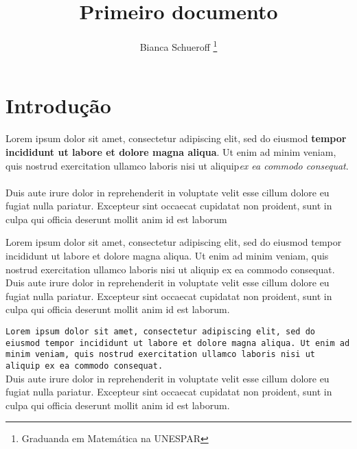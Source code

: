 \documentclass[12pt, a4paper, oneside]{book}
\title{Primeiro documento}
\author{Bianca Schueroff \footnote{Graduanda em Matemática na UNESPAR}}
\begin{document}

\maketitle %


\chapter{Introdução}
\noindent
\textcolor{ocre}{Lorem ipsum dolor sit amet, consectetur adipiscing elit, sed do eiusmod \textbf{tempor incididunt ut labore et dolore magna aliqua}. Ut enim ad minim veniam, quis nostrud exercitation ullamco laboris nisi ut aliquip\textit{ex ea commodo consequat}}.\\

\dotfill\\

\noindent
Duis aute irure dolor in reprehenderit in voluptate velit esse cillum dolore eu fugiat nulla pariatur. Excepteur sint occaecat cupidatat non proident, sunt in culpa qui officia deserunt mollit anim id est laborum


\begin{center}
\Large{\textsf{Lorem ipsum dolor sit amet, consectetur adipiscing elit, sed do eiusmod tempor incididunt ut labore et dolore magna aliqua. Ut enim ad minim veniam, quis nostrud exercitation ullamco laboris nisi ut aliquip ex ea commodo consequat. Duis aute irure dolor in reprehenderit in voluptate velit esse cillum dolore eu fugiat nulla pariatur. Excepteur sint occaecat cupidatat non proident, sunt in culpa qui officia deserunt mollit anim id est laborum.}}
\end{center}

\begin{flushleft}

\huge{\texttt{Lorem ipsum dolor sit amet, consectetur adipiscing elit, sed do eiusmod tempor incididunt ut labore et dolore magna aliqua. Ut enim ad minim veniam, quis nostrud exercitation ullamco laboris nisi ut aliquip ex ea commodo consequat.}\\

\textrm{Duis aute irure dolor in reprehenderit in voluptate velit esse cillum dolore eu fugiat nulla pariatur. Excepteur sint occaecat cupidatat non proident, sunt in culpa qui officia deserunt mollit anim id est laborum.}}
\end{flushleft}
\end{document}
